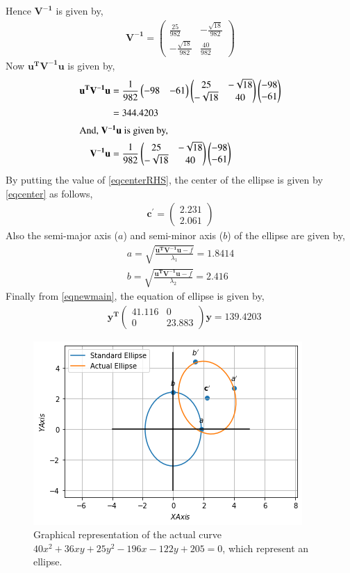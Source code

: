 \documentclass[journal,12pt,twocolumn]{IEEEtran}
\newcommand{\myvec}[1]{\ensuremath{\begin{pmatrix}#1\end{pmatrix}}}
\numberwithin{equation}{subsection}
\let\vec\mathbf
\begin{document}
Hence $\vec{V^{-1}}$ is given by,
\begin{align}
\vec{V^{-1}} = \myvec{\frac{25}{982}&-\frac{\sqrt{18}}{982}\\-\frac{\sqrt{18}}{982}&\frac{40}{982}}
\end{align}
Now $\vec{u^T}\vec{V^{-1}}\vec{u}$ is given by,
\begin{align}
\vec{u^T}\vec{V^{-1}}\vec{u}&=\frac{1}{982}\myvec{-98&-61}\myvec{25&-\sqrt{18}\\-\sqrt{18}&40}\myvec{-98\\-61}\\&=344.4203\label{eqRHS}\\
\intertext{And, $\vec{V^{-1}}\vec{u}$ is given by,}
\vec{V^{-1}}\vec{u} &= \frac{1}{982}\myvec{25&-\sqrt{18}\\-\sqrt{18}&40}\myvec{-98\\-61}\label{eqcenterRHS}\\
\end{align}
By putting the value of \eqref{eqcenterRHS}, the center of the ellipse is given by \eqref{eqcenter} as follows,
\begin{align}
\vec{c^\prime} = \myvec{2.231\\2.061}
\end{align}
Also the semi-major axis ($a$) and semi-minor axis ($b$) of the ellipse are given by,
\begin{align}
a = \sqrt{\frac{\vec{u^T}\vec{V^{-1}}\vec{u}-f}{\lambda_1}}=1.8414\\
b = \sqrt{\frac{\vec{u^T}\vec{V^{-1}}\vec{u}-f}{\lambda_2}}=2.416
\end{align}
Finally from \eqref{eqnewmain}, the equation of ellipse is given by,
\begin{align}
&\vec{y^T}\myvec{41.116&0\\0&23.883}\vec{y}=139.4203\label{eqFinal}
\end{align}
\begin{figure}[!]
 \begin{center}
  \includegraphics[width=\columnwidth]{assignment6/assignment6_fig.png}
    \caption{Graphical representation of the actual curve  $40{x^2}+36{xy}+25{y^2}-196{x}-122{y}+205=0$, which represent an ellipse.}
\label{myfig:1}
    \end{center}
\end{figure}
\end{document}
